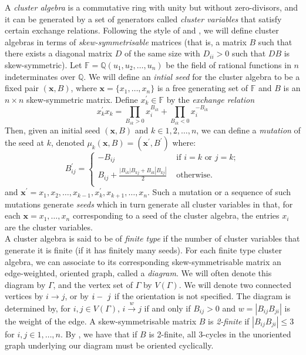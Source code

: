 \documentclass[11pt]{amsart}
\theoremstyle{definition}
\newcommand\V{V(\Gamma)}
\begin{document}
A \textit{cluster algebra} is a commutative ring with unity but without zero-divisors, and it can be generated by a set of generators called \textit{cluster variables} that satisfy certain exchange relations. Following the style of \cite{FZ02} and \cite{BM13}, we will define cluster algebras in terms of \textit{skew-symmetrisable} matrices (that is, a matrix $B$ such that there exists a diagonal matrix $D$ of the same size with $D_{ii} >0$ such that $DB$ is skew-symmetric). Let $\mathbb{F} = \mathbb{Q}(u_1, u_2, \ldots, u_n)$ be the field of rational functions in $n$ indeterminates over $\mathbb{Q}$. We will define an \textit{intial seed} for the cluster algebra to be a fixed pair $(\textbf{x}, B)$, where $\textbf{x} = \{x_1, \ldots, x_n\}$ is a free generating set of $\mathbb{F}$ and $B$ is an $n \times n$ skew-symmetric matrix. Define $x_k^{\prime} \in \mathbb{F}$ by the \textit{exchange relation}
\begin{displaymath}
x_k^{\prime}x_k = \prod_{B_{ik} > 0}{x_i^{B_{ik}}} + \prod_{B_{ik} < 0}{x_i^{-B_{ik}}}
\end{displaymath}
Then, given an initial seed $(\textbf{x}, B)$ and $k \in {1,2,\ldots,n}$, we can define a \textit{mutation} of the seed at $k$, denoted $\mu_k(\boldsymbol{x}, B) = (\textbf{x}^{\prime}, B^{\prime})$ where:
\begin{displaymath}
B_{ij}^{\prime} = \begin{cases} - B_{ij} & \mbox{ if } i = k \mbox{ or } j = k;\\
																B_{ij} + \frac{|B_{ik}|B_{kj} + B_{ik}|B_{kj}|}{2} & \mbox{ otherwise. }\\
									\end{cases}
\end{displaymath}
and $\textbf{x}^{\prime} = {x_1, x_2, \ldots, x_{k-1}, x_k^{\prime}, x_{k+1}, \ldots, x_n}$. 
Such a mutation or a sequence of such mutations generate \textit{seeds} which in turn generate all cluster variables in that, for each $\textbf{x} = {x_1, \ldots, x_n}$ corresponding to a seed of the cluster algebra, the entries $x_i$ are the cluster variables. \\

 A cluster algebra is said to be of \textit{finite type} if the number of cluster variables that generate it is finite (if it has finitely many seeds). For each finite type cluster algebra, we can associate to its corresponding skew-symmetrisable matrix an edge-weighted, oriented graph, called a \textit{diagram}. We will often denote this diagram by $\Gamma$, and the vertex set of $\Gamma$ by $\V$. We will denote two connected vertices by $i \rightarrow j$, or by $i\--\ j$ if the orientation is not specified. The diagram is determined by, for $i, j \in \V$, $i \xrightarrow{w} j$ if and only if $B_{ij} > 0$ and $w = |B_{ij}B_{ji}|$ is the weight of the edge. A skew-symmetrisable matrix $B$ is \textit{2-finite} if $|B_{ij}B_{ji}| \leq 3$ for $i, j \in {1, \ldots, n}$.  By \cite[7.5]{FZ02}, we have that if $B$ is 2-finite, all 3-cycles in the unoriented graph underlying our diagram must be oriented cyclically. \\
\end{document}
